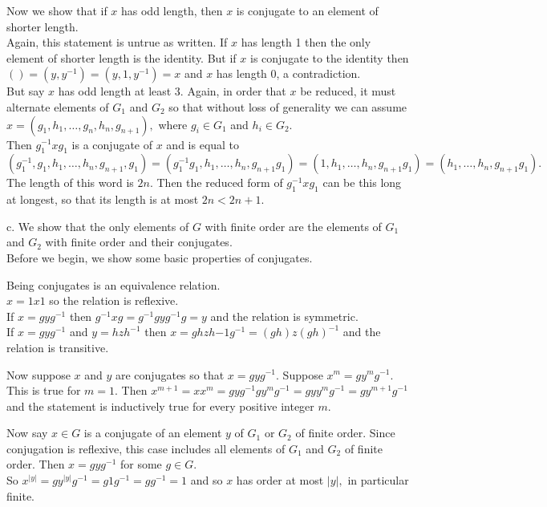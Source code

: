 \documentclass{article}
\begin{document}
Now we show that if $x$ has odd length, then $x$ is conjugate to an element of shorter length.
\\
Again, this statement is untrue as written.  If $x$ has length 1 then the only element of shorter length is the identity.  But if $x$ is conjugate to the identity then $()=(y,y^{-1})=(y,1,y^{-1})=x$ and $x$ has length 0, a contradiction.
\\
But say $x$ has odd length at least 3.  Again, in order that $x$ be reduced, it must alternate elements of $G_1$ and $G_2$ so that without loss of generality we can assume $x=(g_1,h_1,\ldots, g_n,h_n,g_{n+1}),$ where $g_i\in G_1$ and $h_i\in G_2.$
\\
Then $g_1^{-1}xg_1$ is a conjugate of $x$ and is equal to $(g_1^{-1},g_1,h_1,\ldots,h_n,g_{n+1},g_1)=(g_1^{-1}g_1,h_1,\ldots,h_n,g_{n+1}g_1)=(1,h_1,\ldots,h_n,g_{n+1}g_1)=(h_1,\ldots,h_n,g_{n+1}g_1).$  The length of this word is $2n.$  Then the reduced form of $g_1^{-1}xg_1$ can be this long at longest, so that its length is at most $2n<2n+1.$

c.  We show that the only elements of $G$ with finite order are the elements of $G_1$ and $G_2$ with finite order and their conjugates.
\\
Before we begin, we show some basic properties of conjugates.

Being conjugates is an equivalence relation.
\\$x=1x1$ so the relation is reflexive.
\\If $x=gyg^{-1}$ then $g^{-1}xg=g^{-1}gyg^{-1}g=y$ and the relation is symmetric.
\\If $x=gyg^{-1}$ and $y=hzh^{-1}$ then $x=ghzh{-1}g^{-1}=(gh)z(gh)^{-1}$ and the relation is transitive.

Now suppose $x$ and $y$ are conjugates so that $x=gyg^{-1}.$  Suppose $x^m=gy^mg^{-1}.$  This is true for $m=1.$  Then $x^{m+1}=xx^m=gyg^{-1}gy^mg^{-1}=gyy^mg^{-1}=gy^{m+1}g^{-1}$ and the statement is inductively true for every positive integer $m.$

Now say $x\in G$ is a conjugate of an element $y$ of $G_1$ or $G_2$ of finite order.  Since conjugation is reflexive, this case includes all elements of $G_1$ and $G_2$ of finite order.  Then $x=gyg^{-1}$ for some $g\in G.$
\\
So $x^{|y|}=gy^{|y|}g^{-1}=g1g^{-1}=gg^{-1}=1$ and so $x$ has order at most $|y|,$ in particular finite.
\end{document}
